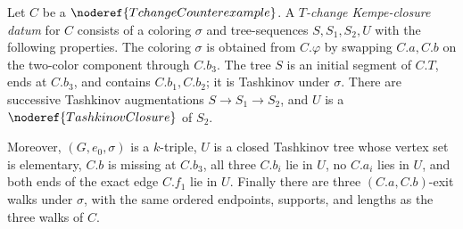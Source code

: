 \begin{definition}
Let \(C\) be a \(\noderef{TchangeCounterexample}\).  A
\emph{\(T\)-change Kempe-closure datum} for \(C\) consists of a coloring
\(\sigma\) and tree-sequences \(S,S_1,S_2,U\) with the following
properties.  The coloring \(\sigma\) is obtained from \(C.\varphi\) by
swapping \(C.a,C.b\) on the two-color component through \(C.b_3\).
The tree \(S\) is an initial segment of \(C.T\), ends at \(C.b_3\), and
contains \(C.b_1,C.b_2\); it is Tashkinov under \(\sigma\).  There are
successive Tashkinov augmentations \(S\to S_1\to S_2\), and \(U\) is a
\(\noderef{TashkinovClosure}\) of \(S_2\).

Moreover, \((G,e_0,\sigma)\) is a \(k\)-triple, \(U\) is a closed
Tashkinov tree whose vertex set is elementary, \(C.b\) is missing at
\(C.b_3\), all three \(C.b_i\) lie in \(U\), no \(C.a_i\) lies in \(U\),
and both ends of the exact edge \(C.f_1\) lie in \(U\).  Finally there
are three \((C.a,C.b)\)-exit walks under \(\sigma\), with the same ordered
endpoints, supports, and lengths as the three walks of \(C\).
\end{definition}
